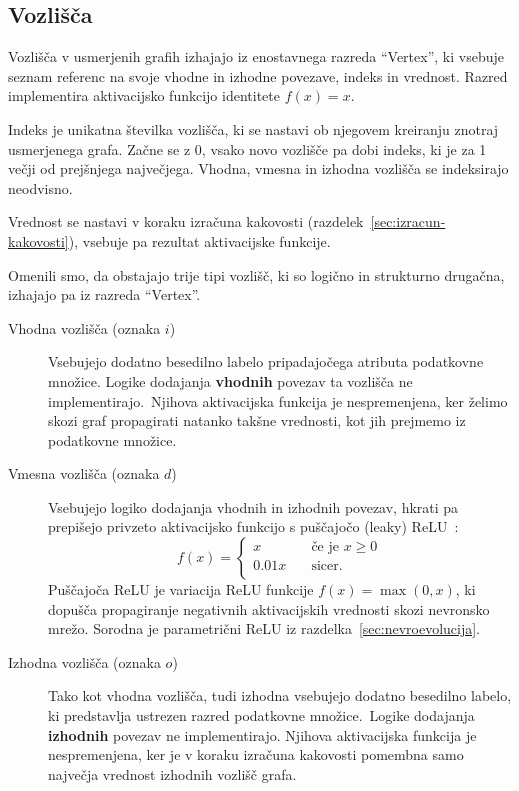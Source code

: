 \documentclass[a4paper,12pt,openright]{book}
\begin{document}
    \subsection{Vozlišča}\label{subsec:vozlisca}
    Vozlišča v usmerjenih grafih izhajajo iz enostavnega razreda \enquote{Vertex}, ki vsebuje seznam referenc
    na svoje vhodne in izhodne povezave, indeks in vrednost.
    Razred implementira aktivacijsko funkcijo identitete $f(x)=x$.

    Indeks je unikatna številka vozlišča, ki se nastavi ob njegovem kreiranju znotraj usmerjenega grafa.
    Začne se z 0, vsako novo vozlišče pa dobi indeks, ki je za 1 večji od prejšnjega največjega.
    Vhodna, vmesna in izhodna vozlišča se indeksirajo neodvisno.

    Vrednost se nastavi v koraku izračuna kakovosti (razdelek~\ref{sec:izracun-kakovosti}), vsebuje pa rezultat aktivacijske funkcije.

    Omenili smo, da obstajajo trije tipi vozlišč, ki so logično in strukturno drugačna, izhajajo
    pa iz razreda \enquote{Vertex}.
    \begin{description}
        \item[Vhodna vozlišča (oznaka $i$)]{Vsebujejo dodatno besedilno labelo pripadajočega atributa podatkovne množice.
        Logike dodajanja \textbf{vhodnih} povezav ta vozlišča ne implementirajo.\ Njihova aktivacijska funkcija je nespremenjena, ker
        želimo skozi graf propagirati natanko takšne vrednosti, kot jih prejmemo iz podatkovne množice. }
        \item[Vmesna vozlišča (oznaka $d$)]{Vsebujejo logiko dodajanja vhodnih in izhodnih povezav, hkrati pa prepišejo
        privzeto aktivacijsko funkcijo s puščajočo (leaky) ReLU~\cite{maas2013rectifier}:
        \begin{equation}
            f(x)=
            \begin{cases}
                x & \quad\text{če je } x\ge0\\
                0.01x & \quad\text{sicer}.\\
            \end{cases}
            \label{eq:leaky_relu}
        \end{equation}
        Puščajoča ReLU je variacija ReLU funkcije $f(x)=\max(0,x)$, ki do\-pušča propagiranje negativnih aktivacijskih
        vrednosti skozi nevronsko mrežo. Sorodna je parametrični ReLU iz razdelka~\ref{sec:nevroevolucija}.}
        \item[Izhodna vozlišča (oznaka $o$)]{Tako kot vhodna vozlišča, tudi izhodna vsebujejo dodatno besedilno labelo, ki predstavlja
        ustrezen razred podatkovne mno\-ži\-ce.\ Logike dodajanja \textbf{izhodnih} povezav ne implementirajo.
        Njihova aktivacijska funkcija je nespremenjena, ker je v koraku izračuna kakovosti pomembna samo največja
        vrednost izhodnih vozlišč grafa. }
    \end{description}
\end{document}
